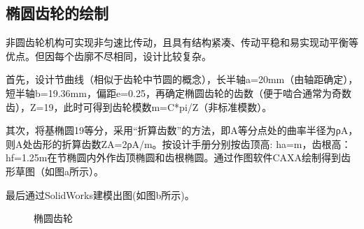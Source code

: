 \documentclass[12pt]{article}
\begin{document}
\begin{CJK}{UTF8}{song}
\subsection{椭圆齿轮的绘制}
非圆齿轮机构可实现非匀速比传动，且具有结构紧凑、传动平稳和易实现动平衡等优点。但因每个齿廓不尽相同，设计比较复杂。\par
首先，设计节曲线（相似于齿轮中节圆的概念），长半轴a=20mm（由轴距确定），短半轴b=19.36mm，偏距e=0.25，再确定椭圆齿轮的齿数（便于啮合通常为奇数齿），Z=19，此时可得到齿轮模数m=C*pi/Z（非标准模数）。\par
其次，将基椭圆19等分，采用“折算齿数”的方法，即A等分点处的曲率半径为ρA，则A处齿形的折算齿数ZA=2ρA/m。按设计手册分别按齿顶高: ha=m，齿根高：hf=1.25m在节椭圆内外作齿顶椭圆和齿根椭圆。通过作图软件CAXA绘制得到齿形草图（如图a所示）。\par
最后通过SolidWorks建模出图(如图b所示)。
\begin{figure}[H]
{}
\quad
{}
\caption{椭圆齿轮}
\end{figure}


\end{CJK}
\end{document}
